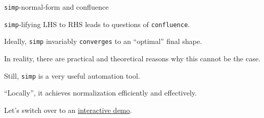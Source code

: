 \documentclass{beamer}
\begin{document}
\begin{frame}[fragile]{{\color{violet}\texttt{simp}}-normal-form and confluence}

{\color{violet}\verb`simp`}-lifying LHS to RHS leads to questions of {\color{violet}\verb`confluence`}.

Ideally, {\color{violet}\verb`simp`} invariably {\color{violet}\verb`converges`} to an ``optimal'' final shape.

In reality, there are practical and theoretical reasons why this cannot be the case.

Still, {\color{violet}\verb`simp`} is a very useful automation tool.

``Locally'', it achieves normalization efficiently and effectively.
\end{frame}

\begin{frame}[fragile]

Let's switch over to an \href{https://leanprover-community.github.io/lean-web-editor/#url=https%3A%2F%2Fraw.githubusercontent.com%2Fadomani%2FAtelier_Lean_2023%2Fadomani_polys%2Fsrc%2Fgeneralizations%2F1.generalizations.presentationTemplate.lean}{interactive demo}.
\end{frame}
\end{document}
